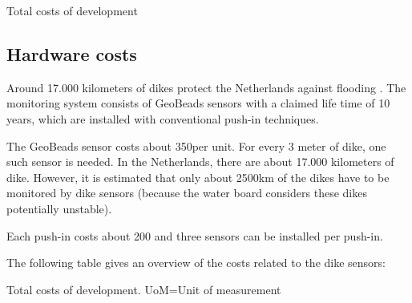 
\tdevcost

\begin{table}[H]
	\pgfplotstabletypeset[
		Costs
	]\tdevcost
	\caption{Total costs of development}
	\label{table:total-dev-costs1}
\end{table}

\subsection{Hardware costs}
Around 17.000 kilometers of dikes protect the Netherlands against flooding \cite{DMC}. 
The monitoring system consists of GeoBeads sensors with a claimed life time of 10 years, which are installed with conventional push-in techniques. 

The GeoBeads sensor costs about 350\EUR per unit. For every 3 meter of dike, one such sensor is needed. In the Netherlands, there are about 17.000 kilometers of dike. However, it is estimated that only about 2500km of the dikes have to be monitored by dike sensors (because the water board considers these dikes potentially unstable).

Each push-in costs about \EUR{}200 and three sensors can be installed per push-in\cite{TUDelftPHD}. %

The following table gives an overview of the costs related to the dike sensors:

\begin{table}[H]
	\label{table:total-dev-costs2} 
	\caption{Total costs of development. UoM=Unit of measurement}
\end{table}


